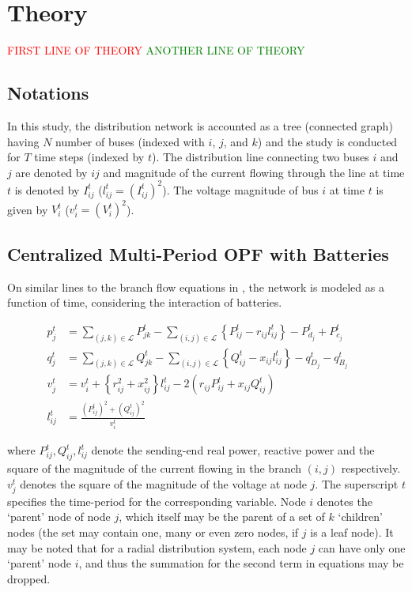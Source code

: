 \documentclass{article}
\begin{document}
\section{Theory}
\textcolor{red}{FIRST LINE OF THEORY}
\textcolor{green}{ANOTHER LINE OF THEORY}

\subsection{Notations}
In this study, the distribution network is accounted as a tree (connected graph) having \(N\) number of buses (indexed with \(i\), \(j\), and \(k\)) and the study is conducted for \(T\) time steps (indexed by \(t\)). The distribution line connecting two buses \(i\) and \(j\) are denoted by {\(ij\)} and magnitude of the current flowing through the line at time \(t\) is denoted by \(I_{ij}^t\) (\(l_{ij}^t=\left(I_{ij}^t\right)^2\)). The voltage magnitude of bus \(i\) at time \(t\) is given by \(V_i^t\) (\(v_i^t=\left(V_i^t\right)^2\)). 

\subsection{Centralized Multi-Period OPF with Batteries}

On similar lines to the branch flow equations in \cite{bfm01}, the network is modeled as a function of time, considering the interaction of batteries.

\begin{align}
    {p_j^t} & = {\sum_{(j, k) \in \mathcal{L}} P_{jk}^t - \sum_{(i, j) \in \mathcal{L}}\left\{P_{ij}^t - r_{ij}l_{ij}^t\right\} - P_{d_j}^t + P_{c_j}^t} && \label{eq:Pij} \\ 
    {q_j^t} & = {\sum_{(j, k) \in \mathcal{L}} Q_{jk}^t - \sum_{(i, j) \in \mathcal{L}}\left\{Q_{ij}^t - x_{ij}l_{ij}^t\right\} - q_{D_j}^t - q_{B_j}^t} && \label{eq:Qij} \\ 
    {v_j^t} & = {v_{i}^t +  \left\{r_{ij}^2 + x_{ij}^2\right\}l_{ij}^t - 2(r_{ij}P_{ij}^t + x_{ij}Q_{ij}^t)} \label{eq:vj} && \\
    {l_{ij}^t} & = {\frac{(P_{ij}^{t})^2 + (Q_{ij}^{t})^2}{v_i^t}} \label{eq:lij}
\end{align}

where $P^{t}_{ij}, Q^{t}_{ij}, l^{t}_{ij}$ denote the sending-end real power, reactive power and the square of the magnitude of the current flowing in the branch $(i, j)$ respectively. $v^{t}_{j}$ denotes the square of the magnitude of the voltage at node $j$. The superscript $t$ specifies the time-period for the corresponding variable. Node $i$ denotes the `parent' node of node $j$, which itself may be the parent of a set of $k$ `children' nodes (the set may contain one, many or even zero nodes, if $j$ is a leaf node). It may be noted that for a radial distribution system, each node $j$ can have only one `parent' node $i$, and thus the summation for the second term in equations  may be dropped.
\end{document}
